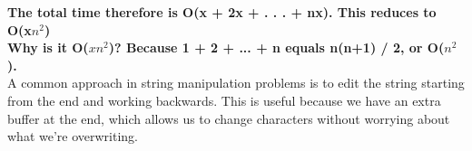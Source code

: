 \documentclass[14pt]{extarticle}
\begin{document}
\textbf{The total time therefore is O(x + 2x + . . . + nx). This reduces to O(x$n^2$)}\\
\textbf{Why is it O($xn^2$)? Because 1 + 2 + ... + n equals n(n+1) / 2, or O($n^2$).}\\

A common approach in string manipulation problems is to edit the string starting from 
the end and working backwards. This is useful because we have an extra buffer at the end,
which allows us to change characters without worrying about what we're overwriting.
\end{document}
